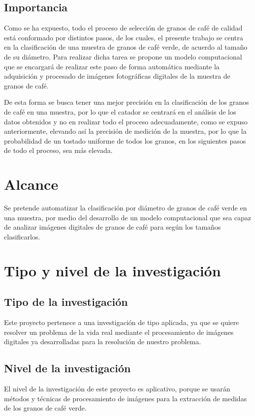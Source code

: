\documentclass[12pt,a4paper,oneside]{book}
\begin{document}
\subsection{Importancia}
Como se ha expuesto, todo el proceso de selección de granos de café de calidad está conformado por distintos pasos, de los cuales, el presente trabajo se centra en la clasificación de una muestra de granos de café verde, de acuerdo al tamaño de su diámetro. Para realizar dicha tarea se propone un modelo computacional que se encargará de realizar este paso de forma automática mediante la adquisición y procesado de imágenes fotográficas digitales de la muestra de granos de café.

De esta forma se busca tener una mejor precisión en la clasificación de los granos de café en una muestra, por lo que el catador se centrará en el análisis de los datos obtenidos y no en realizar todo el proceso adecuadamente, como se expuso anteriormente, elevando así la precisión de medición de la muestra, por lo que la probabilidad de un tostado uniforme de todos los granos, en los siguientes pasos de todo el proceso, sea más elevada.

\section{Alcance}
Se pretende automatizar la clasificación por diámetro de granos de café verde en una muestra, por medio del desarrollo de un modelo computacional que sea capaz de analizar imágenes digitales  de granos de café para según los tamaños clasificarlos.

\section{Tipo y nivel de la investigación}

\subsection{Tipo de la investigación}
Este proyecto pertenece a una investigación de tipo aplicada, ya que se quiere resolver un problema de la vida real mediante el procesamiento de imágenes digitales ya desarrolladas para la resolución de nuestro problema.

\subsection{Nivel de la investigación}
El nivel de la investigación de este proyecto es aplicativo, porque se usarán métodos y técnicas de procesamiento de imágenes para la extracción de medidas de los granos de café verde.
\end{document}

